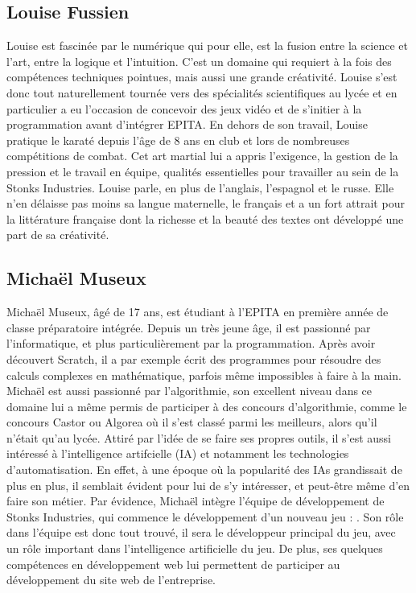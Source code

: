 \subsection*{Louise Fussien}
Louise est fascinée par le numérique qui pour elle, est la fusion entre la science et l'art, entre la logique et l'intuition.
C'est un domaine qui requiert à la fois des compétences techniques pointues, mais aussi une grande créativité.
Louise s'est donc tout naturellement tournée vers des spécialités scientifiques au lycée et en particulier a eu l'occasion de concevoir des jeux vidéo et
de s'initier à la programmation avant d'intégrer EPITA.
En dehors de son travail, Louise pratique le karaté depuis l'âge de 8 ans en club et lors de nombreuses compétitions de combat.
Cet art martial lui a appris l'exigence, la gestion de la pression et le travail en équipe, qualités essentielles pour travailler au sein de la Stonks Industries.
Louise parle, en plus de l'anglais, l'espagnol et le russe. Elle n'en délaisse pas moins sa langue maternelle,
le français et a un fort attrait pour la littérature française dont la richesse et la beauté des textes ont développé une part de sa créativité.

\subsection*{Michaël Museux}
Michaël Museux, âgé de 17 ans, est étudiant à l'EPITA en première année de classe
préparatoire intégrée. Depuis un très jeune âge, il est passionné par l'informatique, et plus
particulièrement par la programmation. Après avoir découvert Scratch, il a par exemple
écrit des programmes pour résoudre des calculs complexes en mathématique, parfois même
impossibles à faire à la main. Michaël est aussi passionné par l'algorithmie, son excellent
niveau dans ce domaine lui a même permis de participer à des concours d'algorithmie, comme
le concours Castor ou Algorea où il s'est classé parmi les meilleurs, alors qu'il n'était qu'au
lycée. Attiré par l'idée de se faire ses propres outils, il s'est aussi intéressé à l'intelligence
artifcielle (IA) et notamment les technologies d'automatisation. En effet, à une époque où la
popularité des IAs grandissait de plus en plus, il semblait évident pour lui de s'y intéresser,
et peut-être même d'en faire son métier.
Par évidence, Michaël intègre l'équipe de développement de Stonks Industries, qui commence
le développement d'un nouveau jeu : \gameName. Son rôle dans l'équipe est donc tout
trouvé, il sera le développeur principal du jeu, avec un rôle important dans l'intelligence
artificielle du jeu. De plus, ses quelques compétences en développement web lui permettent
de participer au développement du site web de l'entreprise.
\\

